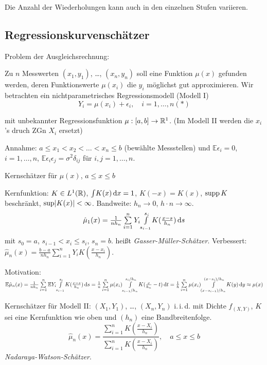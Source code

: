 \documentclass{cheat-sheet}
\newcommand{\E}{\mathbb{E}} %
\newcommand{\iid}{i.\,i.\,d.} %
\begin{document}
\begin{bem}
  Die Anzahl der Wiederholungen kann auch in den einzelnen Stufen variieren.
\end{bem}


\subsection{Regressionskurvenschätzer}

Problem der Ausgleichsrechnung:

Zu $n$ Messwerten $(x_1, y_1)$, \ldots, $(x_n, y_n)$ soll eine Funktion $\mu(x)$ gefunden werden, deren Funktionswerte $\mu(x_i)$ die $y_i$ möglichst gut approximieren.
Wir betrachten ein nichtparametrisches Regressionsmodell (Modell I)
\[
  Y_i = \mu(x_i) + \epsilon_i, \quad
  i = 1, \ldots, n (*)
\]

mit unbekannter Regressionsfunktion $\mu : \left[ a, b \right] \to \mathbb{R}^1$.
(Im Modell II werden die $x_i$'s druch ZGn $X_i$ ersetzt)

Annahme: $a \leq x_1 < x_2 < \ldots < x_n \leq b$ (bewählte Messstellen) und $\E \epsilon_i = 0$, $i = 1, \ldots, n$, $\E \epsilon_i \epsilon_j = \sigma^2 \delta_{ij}$ für $i, j = 1, \ldots, n$.

Kernschätzer für $\mu(x)$, $a \leq x \leq b$

Kernfunktion: $K \in L^1(\mathbb{R})$, ${\textstyle \int} K(x) \,\mathrm{d} x = 1$, $K(-x) = K(x)$, $\operatorname{supp} K$ beschränkt, $\sup \lvert K(x)\rvert < \infty$.
Bandweite: $h_n \to 0$, $h \cdot n \to \infty$.
\[
  \hat{\mu}_1(x) = \tfrac{1}{n h_n} \sum_{i=1}^n Y_i \Int{s_{i-1}}{s_i}{K(\tfrac{x-s}{h_n})}{s}
\]
mit $s_0 = a$, $s_{i-1} < x_i \leq s_i$, $s_n = b$. %
heißt \emph{Gasser-Müller-Schätzer}.
Verbessert: $\hat{\mu}_n(x) = \tfrac{b-a}{n h_n} \sum_{i=1}^n Y_i K(\tfrac{x-x_i}{h_n})$.

Motivation: $\E \hat{\mu}_n(x) = \tfrac{1}{n h_n} \sum_{i=1}^n \E Y_i \Int{s_{i-1}}{s_i}{K(\tfrac{x-s}{h_n})}{s} = \tfrac{1}{n} \sum_{i=1}^n \mu(x_i) \Int{s_{i-1}/h_n}{s_i/h_n}{K(\tfrac{x}{h_n} - t)}{t} = \tfrac{1}{h} \sum_{i=1}^n \mu(x_i) \Int{(x-s_{i-1})/h_n}{(x-s_i)/h_n}{K(y)}{y} \approx \mu(x)$

Kernschätzer für Modell II:
$(X_1, Y_1)$, \ldots, $(X_n, Y_n)$ \iid{} mit Dichte $f_{(X,Y)}$, $K$ sei eine Kernfunktion wie oben und $(h_n)$ eine Bandbreitenfolge.
\[
  \hat{\mu}_n (x) = \frac{\sum_{i=1}^n K(\tfrac{x - X_i}{h_n})}{\sum_{i=1}^n K(\tfrac{x - X_i}{h_n})}, \quad
  a \leq x \leq b
\]
\emph{Nadaraya-Watson-Schätzer}.
\end{document}
